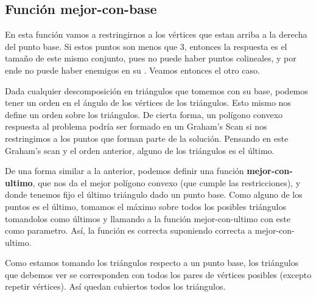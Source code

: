 \subsection{Función mejor-con-base}
\par{
En esta función vamos a restringirnos a los vértices que estan arriba a la derecha del punto base.
Si estos puntos son menos que 3, entonces la respuesta es el tamaño de este mismo conjunto, pues no puede haber puntos colineales, y por ende no puede haber enemigos en su .
Veamos entonces el otro caso.}
\par{
Dada cualquier descomposición en triángulos que tomemos con su base, podemos tener un orden en el ángulo de los vértices de los triángulos. Esto mismo nos define un orden sobre los triángulos.
De cierta forma, un polígono convexo respuesta al problema podría ser formado en un Graham's Scan si nos restringimos a los puntos que forman parte de la solución. Pensando en este Graham's scan y el orden anterior, alguno de los triángulos es el último.}
\par{
De una forma similar a la anterior, podemos definir una función \textbf{mejor-con-ultimo}, que nos da el mejor polígono convexo (que cumple las restricciones), y donde tenemos fijo el último triángulo dado un punto base. Como alguno de los puntos es el último, tomamos el máximo sobre todos los posibles triángulos tomandolos como últimos y llamando a la función mejor-con-ultimo con este como parametro. Así, la función es correcta suponiendo correcta a mejor-con-ultimo.}
\par{
Como estamos tomando los triángulos respecto a un punto base, los triángulos que debemos ver se corresponden con todos los pares de vértices posibles (excepto repetir vértices). Así quedan cubiertos todos los triángulos. }

